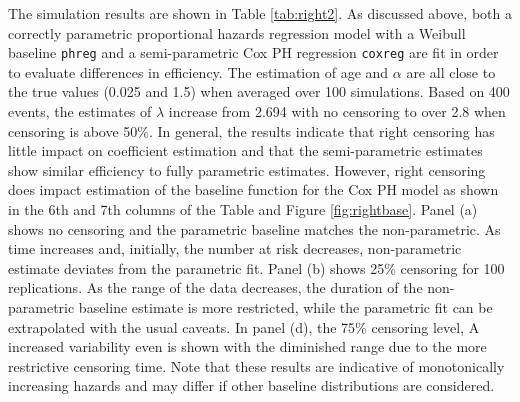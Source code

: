 The simulation results are shown in Table \ref{tab:right2}. As discussed above, both a correctly parametric proportional hazards regression model with a Weibull baseline {\tt phreg} and a semi-parametric Cox PH regression {\tt coxreg} are fit in order to evaluate differences in efficiency. The estimation of age and $\alpha$ are all close to the true values (0.025 and 1.5) when averaged over 100 simulations.  Based on 400 events, the estimates of $\lambda$ increase from 2.694 with no censoring to over 2.8 when censoring is above 50\%. In general, the results indicate that right censoring has little impact on coefficient estimation and that the semi-parametric estimates show similar efficiency to fully parametric estimates. However, right censoring does impact estimation of the  baseline function for the Cox PH model as shown in the 6th and 7th columns of the Table and Figure \ref{fig:rightbase}.  Panel (a) shows no censoring and the parametric baseline matches the non-parametric. As time increases and, initially, the number at risk decreases, non-parametric estimate deviates from the parametric fit. Panel (b) shows 25\% censoring for 100 replications. As the range of the data decreases, the duration of the non-parametric baseline estimate is more restricted, while the parametric fit can be extrapolated with the usual caveats.  In panel (d), the 75\% censoring level, A increased variability even is shown with the diminished range due to the more restrictive censoring time. Note that these results are indicative of monotonically increasing hazards and may differ if other baseline distributions are considered.

